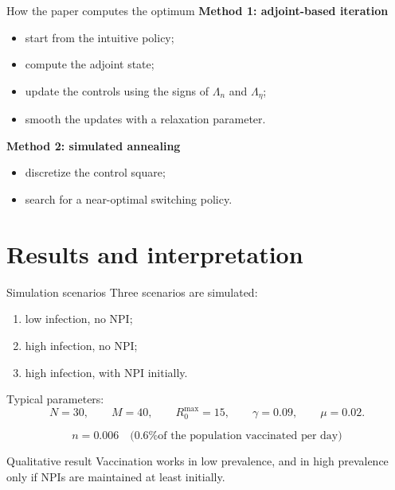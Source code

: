 \documentclass[
11pt,notheorems,hyperref={pdfauthor=whatever}
]{beamer}
\begin{document}
\begin{frame}{How the paper computes the optimum}
	\textbf{Method 1: adjoint-based iteration}
	\begin{itemize}
		\item start from the intuitive policy;
		\item compute the adjoint state;
		\item update the controls using the signs of \(\Lambda_n\) and \(\Lambda_\eta\);
		\item smooth the updates with a relaxation parameter.
	\end{itemize}

	\textbf{Method 2: simulated annealing}
	\begin{itemize}
		\item discretize the control square;
		\item search for a near-optimal switching policy.
	\end{itemize}
\end{frame}

\section{Results and interpretation}

\begin{frame}{Simulation scenarios}
	Three scenarios are simulated:
	\begin{enumerate}
		\item low infection, no NPI;
		\item high infection, no NPI;
		\item high infection, with NPI initially.
	\end{enumerate}

	Typical parameters:
	\[
		N=30,\qquad M=40,\qquad R_0^{\max}=15,\qquad \gamma=0.09,\qquad \mu=0.02.
	\]

	\[
		n=0.006\quad \text{(0.6\% of the population vaccinated per day)}
	\]

	\begin{block}{Qualitative result}
		Vaccination works in low prevalence, and in high prevalence only if NPIs are maintained at least initially.
	\end{block}
\end{frame}
\end{document}
